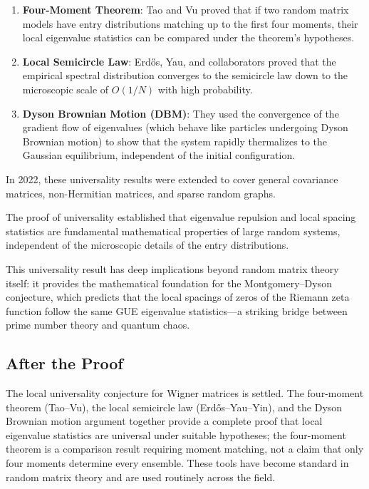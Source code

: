 \begin{enumerate}
\item \textbf{Four-Moment Theorem}: Tao and Vu proved that if two random matrix models have entry distributions matching up to the first four moments, their local eigenvalue statistics can be compared under the theorem's hypotheses.
\item \textbf{Local Semicircle Law}: Erdős, Yau, and collaborators proved that the empirical spectral distribution converges to the semicircle law down to the microscopic scale of $O(1/N)$ with high probability.
\item \textbf{Dyson Brownian Motion (DBM)}: They used the convergence of the gradient flow of eigenvalues (which behave like particles undergoing Dyson Brownian motion) to show that the system rapidly thermalizes to the Gaussian equilibrium, independent of the initial configuration.
\end{enumerate}

In 2022, these universality results were extended to cover general covariance matrices, non-Hermitian matrices, and sparse random graphs.

\begin{highlightbox}
The proof of universality established that eigenvalue repulsion and local spacing statistics are fundamental mathematical properties of large random systems, independent of the microscopic details of the entry distributions.
\end{highlightbox}

This universality result has deep implications beyond random matrix theory itself: it provides the mathematical foundation for the Montgomery--Dyson conjecture, which predicts that the local spacings of zeros of the Riemann zeta function follow the same GUE eigenvalue statistics---a striking bridge between prime number theory and quantum chaos.

\subsection{After the Proof}

The local universality conjecture for Wigner matrices is settled. The four-moment theorem (Tao--Vu), the local semicircle law (Erd\H{o}s--Yau--Yin), and the Dyson Brownian motion argument together provide a complete proof that local eigenvalue statistics are universal under suitable hypotheses; the four-moment theorem is a comparison result requiring moment matching, not a claim that only four moments determine every ensemble. These tools have become standard in random matrix theory and are used routinely across the field.

